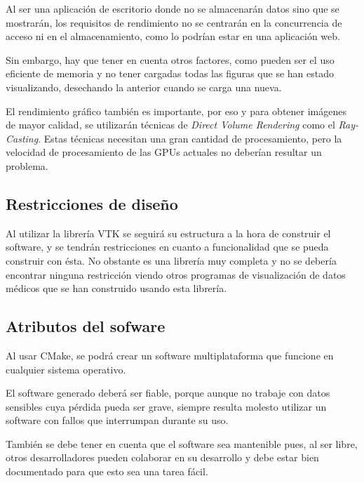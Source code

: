	Al ser una aplicación de escritorio donde no se almacenarán datos sino que se mostrarán, los requisitos de rendimiento no se centrarán en la concurrencia de acceso ni en el almacenamiento, como lo podrían estar en una aplicación web.
	
	Sin embargo, hay que tener en cuenta otros factores, como pueden ser el uso eficiente de memoria y no tener cargadas todas las figuras que se han estado visualizando, desechando la anterior cuando se carga una nueva.
	
	El rendimiento gráfico también es importante, por eso y para obtener imágenes de mayor calidad, se utilizarán técnicas de \textit{Direct Volume Rendering} como el \textit{Ray-Casting}. Estas técnicas necesitan una gran cantidad de procesamiento, pero la velocidad de procesamiento de las GPUs actuales no deberían resultar un problema.
	
	\subsection{Restricciones de diseño}
	
	Al utilizar la librería VTK se seguirá su estructura a la hora de construir el software, y se tendrán restricciones en cuanto a funcionalidad que se pueda construir con ésta. No obstante es una librería muy completa y no se debería encontrar ninguna restricción viendo otros programas de visualización de datos médicos que se han construido usando esta librería.
	
	\subsection{Atributos del sofware}
	
	Al usar CMake, se podrá crear un software multiplataforma que funcione en cualquier sistema operativo.
	
	El software generado deberá ser fiable, porque aunque no trabaje con datos sensibles cuya pérdida pueda ser grave, siempre resulta molesto utilizar un software con fallos que interrumpan durante su uso.
	
	También se debe tener en cuenta que el software sea mantenible pues, al ser libre, otros desarrolladores pueden colaborar en su desarrollo y debe estar bien documentado para que esto sea una tarea fácil.